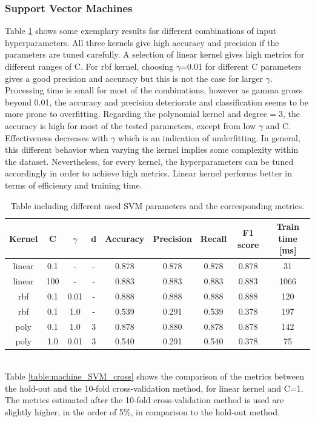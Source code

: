 \documentclass{article}
\begin{document}
\subsubsection*{Support Vector Machines}
Table \ref{table:machine_SVM} shows some exemplary results for different combinations of input hyperparameters. All three kernels give high accuracy and precision if the parameters are tuned carefully. A selection of linear kernel gives high metrics for different ranges of C. For rbf kernel, choosing $\gamma$=0.01 for different C parameters gives a good precision and accuracy but this is not the case for larger $\gamma$. Processing time is small for most of the combinations, however as gamma grows beyond 0.01, the accuracy and precision deteriorate and classification seems to be more prone to overfitting. Regarding the polynomial kernel and degree$=$3, the accuracy is high for most of the tested parameters, except from low $\gamma$ and C. Effectiveness decreases with $\gamma$ which is an indication of underfitting. In general, this different behavior when varying the kernel implies some complexity within the dataset. Nevertheless, for every kernel, the hyperparameters can be tuned accordingly in order to achieve high metrics. Linear kernel performs better in terms of efficiency and training time.
\begin{table}[h!]
\centering
\begin{tabular}{||c c c c c c c c c||} 
 \hline
 Kernel & C & $\gamma$ &d & Accuracy & Precision & Recall & F1 score & Train time [ms] \\ [0.5ex] 
 \hline\hline
 linear & 0.1 & - & - & 0.878 & 0.878 & 0.878 & 0.878 & 31 \\
 linear & 100 & - & - & 0.883 & 0.883 & 0.883 & 0.883 & 1066 \\
 rbf & 0.1 & 0.01 &- &  0.888 & 0.888 & 0.888 & 0.888 & 120  \\
 rbf & 0.1 & 1.0 & - & 0.539 & 0.291 & 0.539 & 0.378 & 197 \\
 poly & 0.1 &  1.0 &  3 & 0.878 & 0.880 &  0.878 & 0.878 & 142  \\ 
 poly & 1.0 &  0.01 &  3 & 0.540 & 0.291 &  0.540 & 0.378 & 75  \\[1ex] 
 \hline
\end{tabular}
\caption{Table including different used SVM parameters and the corresponding metrics.}
\label{table:machine_SVM}
\end{table}
\\ 
Table \ref{table:machine_SVM_cross} shows the comparison of the metrics between the hold-out and the 10-fold cross-validation method, for linear kernel and C=1. The metrics estimated after the 10-fold cross-validation method is used are slightly higher, in the order of 5$\%$, in comparison to the hold-out method. 
\end{document}
